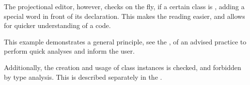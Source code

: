 
The projectional editor, however, checks on the fly, if a certain class is , adding a special  word 
in front of its declaration. This makes the reading easier, and allows for quicker understanding of a code. 

This example demonstrates a general principle, see  the , of an advised practice to 
perform quick analyses and inform the user.

Additionally, the creation and usage of  class instances is checked, and forbidden by type analysis. This is 
described separately in the .
